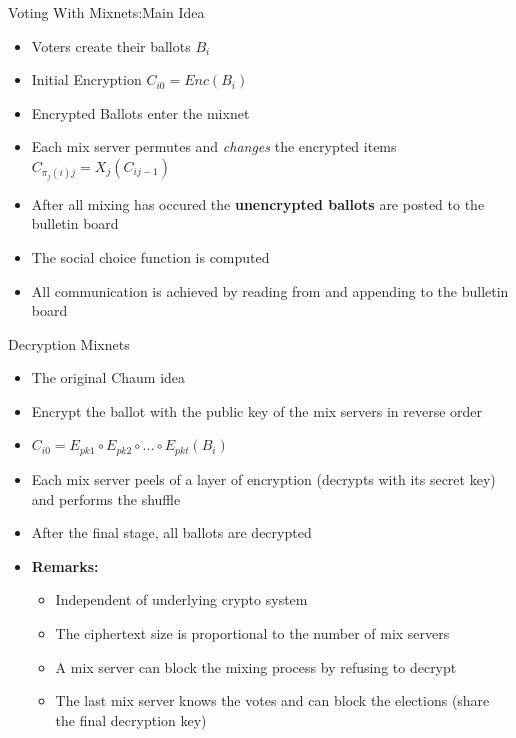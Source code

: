 \documentclass{beamer}
\begin{document}
\begin{frame}{Voting With Mixnets:Main Idea}
\begin{itemize}
\item Voters create their ballots $B_i$
\item Initial Encryption $C_{i0} = Enc(B_i)$
\item Encrypted Ballots enter the mixnet
\item Each mix server permutes and \textit{changes} the encrypted items $C_{\pi_j(i)j} = X_j(C_{ij-1})$
\item After all mixing has occured the \textbf{unencrypted ballots} are posted to the bulletin board
\item The social choice function is computed
\item All communication is achieved by reading from and appending to the bulletin board
\end{itemize}
\end{frame} 

\begin{frame}{Decryption Mixnets}
\begin{itemize}
\item The original Chaum idea
\item Encrypt the ballot with the public key of the mix servers in reverse order
\item $ C_{i0} = E_{pk1} \circ E_{pk2} \circ ... \circ E_{pkt} (B_i) $
\item Each mix server peels of a layer of encryption (decrypts with its secret key) and performs the shuffle
\item After the final stage, all ballots are decrypted
\item \textbf{Remarks:} 
\begin{itemize}
\item Independent of underlying crypto system
\item The ciphertext size is proportional to the number of mix servers
\item A mix server can block the mixing process by refusing to decrypt
\item The last mix server knows the votes and can block the elections (share the final decryption key)
\end{itemize} 
\end{itemize}
\end{frame} 
\end{document}
